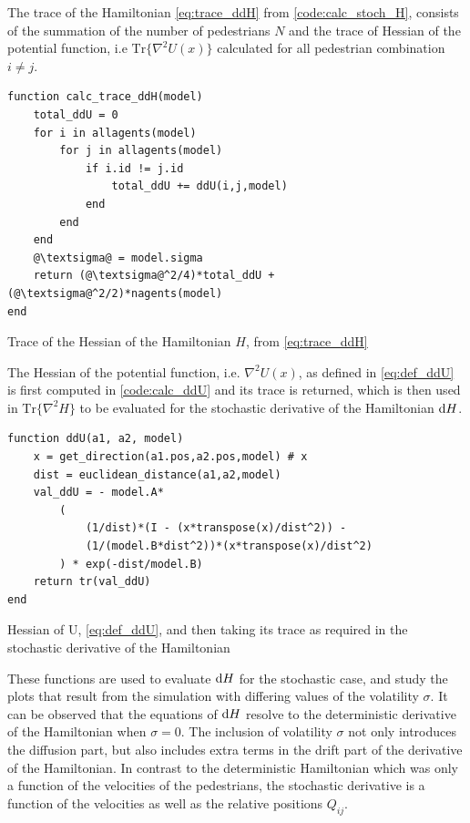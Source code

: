 The trace of the Hamiltonian \autoref{eq:trace_ddH} from \autoref{code:calc_stoch_H}, consists of the summation of the number of pedestrians $N$ and the trace of Hessian of the potential function, i.e $\text{Tr}\{\nabla^2 U(x)\}$ calculated for all pedestrian combination $i \neq j$.

\begin{listing}[H]
\begin{verbatim}    
function calc_trace_ddH(model)
    total_ddU = 0
    for i in allagents(model)
        for j in allagents(model)
            if i.id != j.id
                total_ddU += ddU(i,j,model)
            end
        end
    end
    @\textsigma@ = model.sigma
    return (@\textsigma@^2/4)*total_ddU + (@\textsigma@^2/2)*nagents(model)
end
\end{verbatim}
\caption{Trace of the Hessian of the Hamiltonian $H$, from \autoref{eq:trace_ddH}}
\label{code:calc_trace_ddH}
\end{listing}

The Hessian of the potential function, i.e. $\nabla^2 U(x)$, as defined in \autoref{eq:def_ddU} is first computed in \autoref{code:calc_ddU} and its trace is returned, which is then used in $\text{Tr}\{\nabla^2 H\}$ to be evaluated for the stochastic derivative of the Hamiltonian $\mathrm d H$.

\begin{listing}[H]
\begin{verbatim}    
function ddU(a1, a2, model)
    x = get_direction(a1.pos,a2.pos,model) # x
    dist = euclidean_distance(a1,a2,model)
    val_ddU = - model.A*
        ( 
            (1/dist)*(I - (x*transpose(x)/dist^2)) - 
            (1/(model.B*dist^2))*(x*transpose(x)/dist^2)
        ) * exp(-dist/model.B)
    return tr(val_ddU)
end
\end{verbatim}
\caption{Hessian of U, \autoref{eq:def_ddU}, and then taking its trace as required in the stochastic derivative of the Hamiltonian}
\label{code:calc_ddU}
\end{listing}

These functions are used to evaluate $\mathrm d H$ for the stochastic case, and study the plots that result from the simulation with differing values of the volatility $\sigma$. It can be observed that the equations of $\mathrm d H$ resolve to the deterministic derivative of the Hamiltonian when $\sigma = 0$. The inclusion of volatility $\sigma$ not only introduces the diffusion part, but also includes extra terms in the drift part of the derivative of the Hamiltonian. In contrast to the deterministic Hamiltonian which was only a function of the velocities of the pedestrians, the stochastic derivative is a function of the velocities as well as the relative positions $Q_{ij}$.

